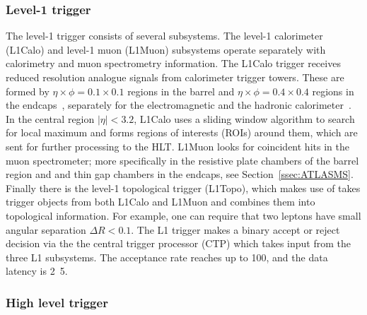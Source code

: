 \subsubsection{Level-1 trigger}

The level-1 trigger consists of several subsystems. The level-1 calorimeter (L1Calo) and level-1 muon (L1Muon) subsystems operate separately with calorimetry and muon spectrometry information. The L1Calo trigger receives reduced resolution analogue signals from calorimeter trigger towers. These are formed by $\eta\times\phi=0.1\times0.1$ regions in the barrel and $\eta\times\phi=0.4\times0.4$ regions in the endcaps~\cite{pdg_2021}, separately for the electromagnetic and the hadronic calorimeter~\cite{Aad:2716326}. In the central region $|\eta| < 3.2$, L1Calo uses a sliding window algorithm to search for local maximum and forms regions of interests (ROIs) around them, which are sent for further processing to the HLT. L1Muon looks for coincident hits in the muon spectrometer; more specifically in the resistive plate chambers of the barrel region and and thin gap chambers in the endcaps, see Section~\ref{ssec:ATLASMS}. Finally there is the level-1 topological trigger (L1Topo), which makes use of takes trigger objects from both L1Calo and L1Muon and combines them into topological information. For example, one can require that two leptons have small angular separation $\Delta R < 0.1$. The L1 trigger makes a binary accept or reject decision via the the central trigger processor (CTP) which takes input from the three L1 subsystems. The acceptance rate reaches up to \unit{100}{\kilo\hertz}, and the data latency is \unit{2.5}{\micro\second}. 

\subsubsection{High level trigger}

